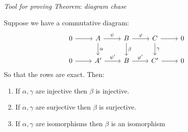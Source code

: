 \emph{Tool for proving Theorem}: \emph{diagram chase}

\begin{lemma}\label{lemma-short-five}
	Suppose we have a commutative diagram:
	\[\begin{tikzcd}
			0 & A & B & C & 0 \\
			0 & {A^\prime} & B & {C^\prime} & 0
			\arrow[from=1-1, to=1-2]
			\arrow["\psi", from=1-2, to=1-3]
			\arrow["\varphi", from=1-3, to=1-4]
			\arrow[from=1-4, to=1-5]
			\arrow["\gamma", from=1-4, to=2-4]
			\arrow[from=2-4, to=2-5]
			\arrow["{\varphi^\prime}", from=2-3, to=2-4]
			\arrow["\beta", from=1-3, to=2-3]
			\arrow["{\psi^\prime}", from=2-2, to=2-3]
			\arrow["\alpha", from=1-2, to=2-2]
			\arrow[from=2-1, to=2-2]
		\end{tikzcd}\]
	So that the rows are exact. Then:
	\begin{enumerate}
		\item If $\alpha, \gamma$ are injective then $\beta$ is injective.
		\item If $\alpha, \gamma$ are surjective then $\beta$ is surjective.
		\item If $\alpha, \gamma$ are isomorphisms then $\beta$ is an isomorphism
	\end{enumerate}
\end{lemma}

